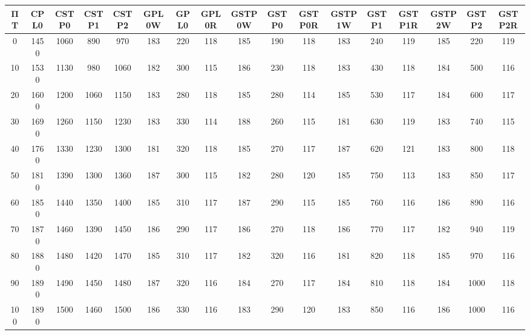 \begin{tabular}{|c|c|c|c|c|c|c|c|c|c|c|c|c|c|c|c|c|}
\hline
ΠΤ&CPL0&CSTP0&CSTP1&CSTP2&GPL0W&GPL0&GPL0R&GSTP0W&GSTP0&GSTP0R&GSTP1W&GSTP1&GSTP1R&GSTP2W&GSTP2&GSTP2R\\\hline
\hline
0&1450&1060&890&970&183&220&118&185&190&118&183&240&119&185&220&119\\
\hline
10&1530&1130&980&1060&182&300&115&186&230&118&183&430&118&184&500&116\\
\hline
20&1600&1200&1060&1150&183&280&118&185&280&114&185&530&117&184&600&117\\
\hline
30&1690&1260&1150&1230&183&330&114&188&260&115&181&630&119&183&740&115\\
\hline
40&1760&1330&1230&1300&181&320&118&185&270&117&187&620&121&183&800&118\\
\hline
50&1810&1390&1300&1360&187&300&115&182&280&120&185&750&113&183&850&117\\
\hline
60&1850&1440&1350&1400&185&310&117&187&290&115&185&760&116&186&890&116\\
\hline
70&1870&1460&1390&1450&186&290&117&186&270&118&186&770&117&182&940&119\\
\hline
80&1880&1480&1420&1470&185&310&117&182&320&116&181&820&118&185&970&116\\
\hline
90&1890&1490&1450&1480&187&320&116&184&270&117&184&810&118&184&1000&118\\
\hline
100&1890&1500&1460&1500&186&330&116&183&290&120&183&850&116&186&1000&116\\
\hline
\end{tabular}
